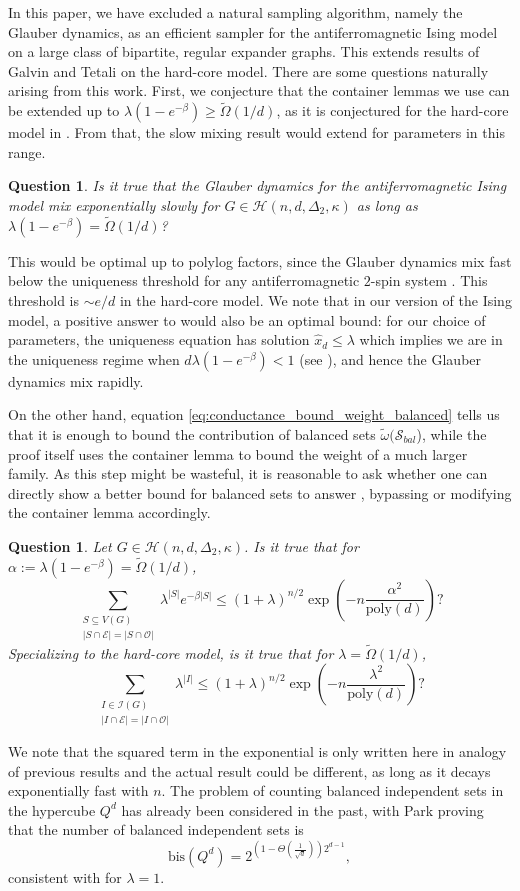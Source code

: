\documentclass[reqno,a4paper,11pt]{amsart}
\newtheorem{question}[theorem]{Question}
\newcommand{\cE}{\mathcal{E}}
\newcommand{\cH}{\mathcal{H}}
\newcommand{\cI}{\mathcal{I}}
\newcommand{\cO}{\mathcal{O}}
\newcommand{\cS}{\mathcal{S}}
\newcommand{\lam}{\lambda}
\newcommand{\om}{\omega}
\newcommand{\Om}{\Omega}
\newcommand{\ex}{\kappa}
\newcommand{\codeg}{\Delta_2}
\begin{document}
In this paper, we have excluded a natural sampling algorithm, namely the Glauber dynamics, as an efficient sampler for the antiferromagnetic Ising model on a large class of bipartite, regular expander graphs. This extends results of Galvin and Tetali \cite{GaTe2006} on the hard-core model. There are some questions naturally arising from this work. First, we conjecture that the container lemmas we use can be extended up to $\lam(1-e^{-\beta})\geq\tilde\Om(1/d)$, as it is conjectured for the hard-core model in \cite{galvin2011threshold}. From that, the slow mixing result would extend for parameters in this range. 
\begin{question}\label{quest:threshold}
    Is it true that the Glauber dynamics for the antiferromagnetic Ising model mix exponentially slowly for $G\in\cH(n,d,\codeg,\ex)$ as long as $\lam(1-e^{-\beta})=\tilde\Om(1/d)$? 
\end{question}
This would be optimal up to polylog factors, since the Glauber dynamics mix fast below the uniqueness threshold for any antiferromagnetic $2$-spin system \cite{chen2023rapid, li2013correlation}. This threshold is $\sim e/d$ in the hard-core model. We note that in our version of the Ising model, a positive answer to  would also be an optimal bound: for our choice of parameters, the uniqueness equation has solution $\hat{x}_d\leq\lam$ which implies we are in the uniqueness regime when $d\lam(1-e^{-\beta})<1$ (see \cite[Definition 2.3]{li2013correlation}), and hence the Glauber dynamics mix rapidly.

On the other hand, equation \eqref{eq:conductance_bound_weight_balanced} tells us that it is enough to bound the contribution of balanced sets $\tilde\om(\cS_{bal}$), while the proof itself uses the container lemma to bound the weight of a much larger family. As this step might be wasteful, it is reasonable to ask whether one can directly show a better bound for balanced sets to answer , bypassing or modifying the container lemma accordingly.
\begin{question}\label{quest:balanced}
    Let $G\in\cH(n,d,\codeg,\ex)$. Is it true that for $\alpha:=\lam(1-e^{-\beta})=\tilde\Om(1/d)$,
    $$\sum_{\substack{S\subseteq V(G)\\ |S\cap\cE|=|S\cap\cO|}}\lam^{|S|}e^{-\beta|S|}\leq (1+\lam)^{n/2}\exp\left(-n\frac{\alpha^2}{\textrm{poly}(d)}\right)?$$
    Specializing to the hard-core model, is it true that for $\lam=\tilde\Om(1/d)$,
    $$\sum_{\substack{I\in\cI(G)\\ |I \cap \cE|=|I \cap \cO|}}\lam^{|I|}\leq (1+\lam)^{n/2}\exp\left(-n\frac{\lam^2}{\textrm{poly}(d)}\right)?$$
\end{question}
We note that the squared term in the exponential is only written here in analogy of previous results and the actual result could be different, as long as it decays exponentially fast with $n$. The problem of counting balanced independent sets in the hypercube $Q^d$ has already been considered in the past, with Park \cite{park2022note} proving that the number of balanced independent sets is 
$$\text{bis}(Q^d)=2^{\left(1-\Theta\left(\frac{1}{\sqrt{d}}\right)\right)2^{d-1}},$$
consistent with  for $\lam=1$.
\end{document}
